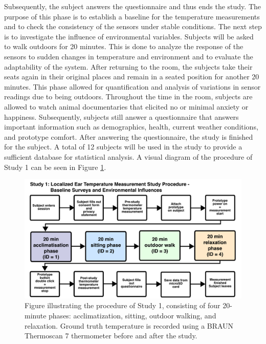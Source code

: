 Subsequently, the subject answers the questionnaire and thus ends the study.
The purpose of this phase is to establish a baseline for the temperature measurements and to check the consistency of the sensors under stable conditions.
The next step is to investigate the influence of environmental variables. 
Subjects will be asked to walk outdoors for 20 minutes. 
This is done to analyze the response of the sensors to sudden changes in temperature and environment and to evaluate the adaptability of the system.
After returning to the room, the subjects take their seats again in their original places and remain in a seated position for another 20 minutes. 
This phase allowed for quantification and analysis of variations in sensor readings due to being outdoors.
Throughout the time in the room, subjects are allowed to watch animal documentaries that elicited no or minimal anxiety or happiness. 
Subsequently, subjects still answer a questionnaire that answers important information such as demographics, health, current weather conditions, and prototype comfort.
After answering the questionnaire, the study is finished for the subject.
A total of 12 subjects will be used in the study to provide a sufficient database for statistical analysis.
A visual diagram of the procedure of Study 1 can be seen in Figure \ref{fig:design:study1:procedure}.

\begin{figure}[t]
    \centering
    \includegraphics[width=\textwidth]{thesis-doc/images/study1/Procedure.pdf}
    \caption{Figure illustrating the procedure of Study 1, consisting of four 20-minute phases: acclimatization, sitting, outdoor walking, and relaxation. Ground truth temperature is recorded using a BRAUN Thermoscan 7 thermometer before and after the study.}
    \label{fig:design:study1:procedure}
\end{figure}

